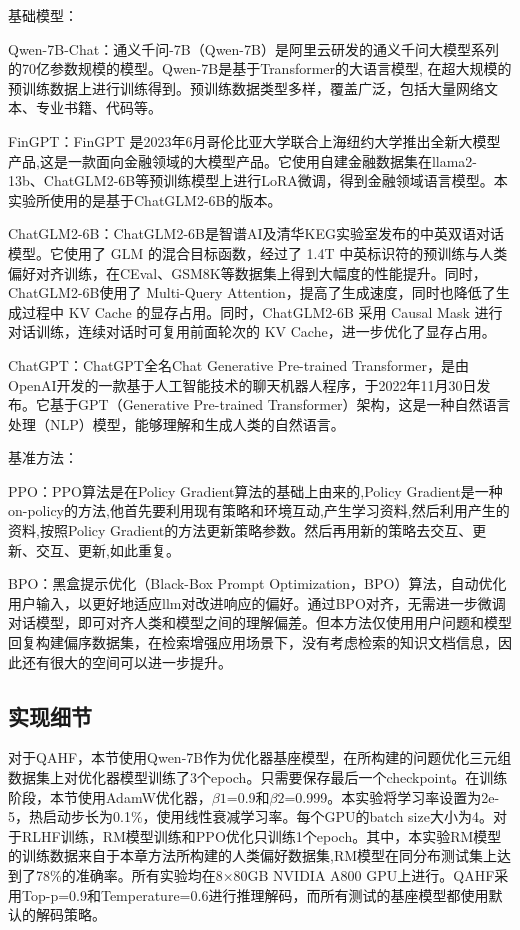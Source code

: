 基础模型：

Qwen-7B-Chat\cite{qwen}：通义千问-7B（Qwen-7B）是阿里云研发的通义千问大模型系列的70亿参数规模的模型。Qwen-7B是基于Transformer的大语言模型, 在超大规模的预训练数据上进行训练得到。预训练数据类型多样，覆盖广泛，包括大量网络文本、专业书籍、代码等。

FinGPT\cite{yang2023fingpt}：FinGPT 是2023年6月哥伦比亚大学联合上海纽约大学推出全新大模型产品,这是一款面向金融领域的大模型产品。它使用自建金融数据集在llama2-13b、ChatGLM2-6B等预训练模型上进行LoRA微调，得到金融领域语言模型。本实验所使用的是基于ChatGLM2-6B的版本。

ChatGLM2-6B\cite{DBLP:conf/iclr/ZengLDWL0YXZXTM23}：ChatGLM2-6B是智谱AI及清华KEG实验室发布的中英双语对话模型。它使用了 GLM 的混合目标函数，经过了 1.4T 中英标识符的预训练与人类偏好对齐训练，在CEval、GSM8K等数据集上得到大幅度的性能提升。同时，ChatGLM2-6B使用了 Multi-Query Attention，提高了生成速度，同时也降低了生成过程中 KV Cache 的显存占用。同时，ChatGLM2-6B 采用 Causal Mask 进行对话训练，连续对话时可复用前面轮次的 KV Cache，进一步优化了显存占用。

ChatGPT\cite{DBLP:conf/nips/Ouyang0JAWMZASR22}：ChatGPT全名Chat Generative Pre-trained Transformer，是由OpenAI开发的一款基于人工智能技术的聊天机器人程序，于2022年11月30日发布。它基于GPT（Generative Pre-trained Transformer）架构，这是一种自然语言处理（NLP）模型，能够理解和生成人类的自然语言。

基准方法：

PPO\cite{DBLP:journals/corr/SchulmanWDRK17}：PPO算法是在Policy Gradient算法的基础上由来的,Policy Gradient是一种on-policy的方法,他首先要利用现有策略和环境互动,产生学习资料,然后利用产生的资料,按照Policy Gradient的方法更新策略参数。然后再用新的策略去交互、更新、交互、更新,如此重复。

BPO\cite{DBLP:journals/corr/abs-2311-04155}：黑盒提示优化（Black-Box Prompt Optimization，BPO）算法，自动优化用户输入，以更好地适应llm对改进响应的偏好。通过BPO对齐，无需进一步微调对话模型，即可对齐人类和模型之间的理解偏差。但本方法仅使用用户问题和模型回复构建偏序数据集，在检索增强应用场景下，没有考虑检索的知识文档信息，因此还有很大的空间可以进一步提升。

\subsection{实现细节}

对于QAHF，本节使用Qwen-7B作为优化器基座模型，在所构建的问题优化三元组数据集上对优化器模型训练了3个epoch。只需要保存最后一个checkpoint。在训练阶段，本节使用AdamW优化器，$\beta1$=0.9和$\beta2$=0.999。本实验将学习率设置为2e-5，热启动步长为0.1\%，使用线性衰减学习率。每个GPU的batch size大小为4。对于RLHF训练，RM模型训练和PPO优化只训练1个epoch。其中，本实验RM模型的训练数据来自于本章方法所构建的人类偏好数据集,RM模型在同分布测试集上达到了78\%的准确率。所有实验均在8×80GB NVIDIA A800 GPU上进行。QAHF采用Top-p=0.9和Temperature=0.6进行推理解码，而所有测试的基座模型都使用默认的解码策略。

